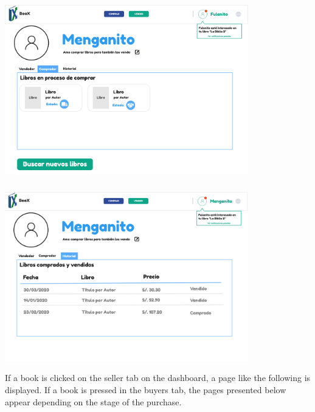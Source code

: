     \subsubsection*{}
    \begin{center}
    \includegraphics[width=300pt]{img/mockups/Huascar Retrieval Team - Dashboard comprador.jpg}
    \end{center}
    \subsubsection*{}
    \begin{center}
    \includegraphics[width=300pt]{img/mockups/Huascar Retrieval Team - Dashboard historial.jpg}
\end{center}

If a book is clicked on the seller tab on the dashboard, a page like the following is displayed. If a book is pressed in the buyers tab, the pages presented below appear depending on the stage of the purchase.

